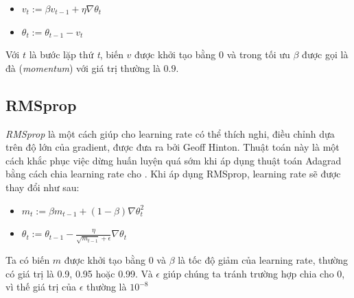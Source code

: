 \begin{itemize}
\item[] $v_t:= \beta v_{t-1} +\eta \nabla\theta_{t}$
\item[]  $ \theta_t:= \theta_{t-1} - v_t$
\end{itemize}
Với $t$ là bước lặp thứ \textit{t}, biến $v$ được khởi tạo bằng 0 và trong tối ưu $\beta$ được gọi là đà (\textit{momentum}) với giá trị thường là $0.9$.
%
%

\subsection{RMSprop}
 \textit{RMSprop} là một cách giúp cho learning rate có thể thích nghi, điều chỉnh dựa trên độ lớn của gradient, được đưa ra bởi Geoff Hinton. Thuật toán này là một cách khắc phục việc dừng huấn luyện quá sớm khi áp dụng thuật toán Adagrad bằng cách chia learning rate cho . Khi áp dụng RMSprop, learning rate sẽ được thay đổi như sau:
\begin{itemize}
\item[] $m_t := \beta m_{t-1} + (1-\beta) \nabla\theta_{t}^2  $
\item[] $\theta_t := \theta_{t-1} - \frac{\eta}{\sqrt{m_{t-1}}+\epsilon}\nabla\theta_{t}$
\end{itemize}
Ta có biến $m$ được khởi tạo bằng 0 và $\beta$ là tốc độ giảm của learning rate, thường có giá trị là 0.9, 0.95 hoặc 0.99. Và $\epsilon$ giúp chúng ta tránh trường hợp chia cho 0, vì thế giá trị của $\epsilon$ thường là $10^{-8}$ 
